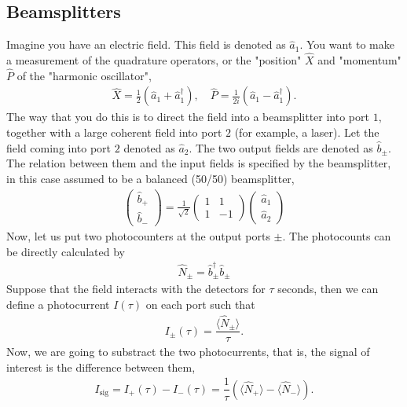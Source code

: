 \documentclass{article}
\begin{document}
\subsection{Beamsplitters}
Imagine you have an electric field. This field is denoted as $\hat{a}_1$. You want to make a measurement of the quadrature operators, or the "position" $\hat{X}$ and "momentum" $\hat{P}$ of the "harmonic oscillator",
\begin{align}
    \hat{X} = \frac{1}{2}(\hat{a}_1+\hat{a}_1^\dagger),\quad 
    \hat{P} = \frac{1}{2i}(\hat{a}_1-\hat{a}_1^\dagger).
\end{align}
The way that you do this is to direct the field into a beamsplitter into port $1$, together with a large coherent field into port $2$ (for example, a laser). Let the field coming into port $2$ denoted as $\hat{a}_2$. The two output fields are denoted as $\hat{b}_{\pm}$. The relation between them and the input fields is specified by the beamsplitter, in this case assumed to be a balanced (50/50) beamsplitter,
\begin{align}
    \begin{pmatrix}
        \hat{b}_{+} \\
        \hat{b}_{-} 
    \end{pmatrix} = \frac{1}{\sqrt{2}}
    \begin{pmatrix}
        1 & 1 \\
        1 & -1
    \end{pmatrix}
    \begin{pmatrix}
        \hat{a}_{1} \\
        \hat{a}_{2} 
    \end{pmatrix}
\end{align}
Now, let us put two photocounters at the output ports $\pm$. The photocounts can be directly calculated by 
\begin{align}
    \hat{N}_{\pm} = \hat{b}_{\pm}^\dagger \hat{b}_{\pm}
\end{align}
Suppose that the field interacts with the detectors for $\tau$ seconds, then we can define a photocurrent $I(\tau)$ on each port such that
\begin{align}\label{eqn7}
    I_{\pm}(\tau) = \dfrac{\langle\hat{N}_{\pm}\rangle}{\tau}.
\end{align}
Now, we are going to substract the two photocurrents, that is, the signal of interest is the difference between them,
\begin{align}
    I_{\text{sig}} = I_{+}(\tau) - I_{-}(\tau) = \dfrac{1}{\tau}\left(\langle\hat{N}_{+}\rangle-\langle\hat{N}_{-}\rangle\right).
\end{align}
\end{document}
